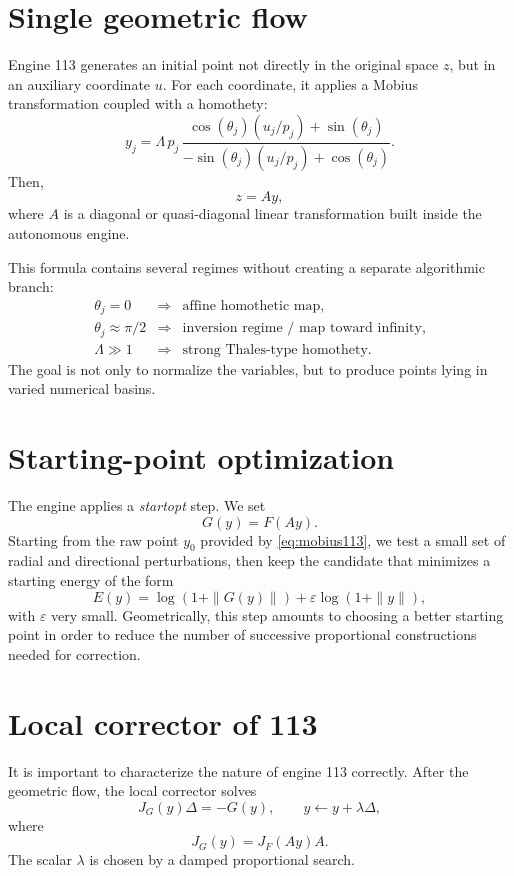 \documentclass[11pt,a4paper]{article}
\begin{document}
\section{Single geometric flow}
Engine 113 generates an initial point not directly in the original space \(z\), but in an auxiliary coordinate \(u\). For each coordinate, it applies a Mobius transformation coupled with a homothety:
\begin{equation}
  y_j
  = \Lambda\, p_j\,
    \frac{\cos(\theta_j)(u_j/p_j)+\sin(\theta_j)}
         {-\sin(\theta_j)(u_j/p_j)+\cos(\theta_j)}.
  \label{eq:mobius113}
\end{equation}
Then,
\begin{equation}
  z = A y,
  \label{eq:linear113}
\end{equation}
where \(A\) is a diagonal or quasi-diagonal linear transformation built inside the autonomous engine.

This formula contains several regimes without creating a separate algorithmic branch:
\[
\begin{array}{lll}
\theta_j=0 & \Rightarrow & \text{affine homothetic map},\\
\theta_j\approx \pi/2 & \Rightarrow & \text{inversion regime / map toward infinity},\\
\Lambda\gg 1 & \Rightarrow & \text{strong Thales-type homothety}.
\end{array}
\]
The goal is not only to normalize the variables, but to produce points lying in varied numerical basins.

\section{Starting-point optimization}
The engine applies a \emph{startopt} step. We set
\[
  G(y)=F(Ay).
\]
Starting from the raw point \(y_0\) provided by \eqref{eq:mobius113}, we test a small set of radial and directional perturbations, then keep the candidate that minimizes a starting energy of the form
\begin{equation}
  E(y)=\log(1+\|G(y)\|)+\varepsilon\log(1+\|y\|),
  \label{eq:startopt113}
\end{equation}
with \(\varepsilon\) very small. Geometrically, this step amounts to choosing a better starting point in order to reduce the number of successive proportional constructions needed for correction.

\section{Local corrector of 113}
It is important to characterize the nature of engine 113 correctly. After the geometric flow, the local corrector solves
\begin{equation}
  J_G(y)\Delta=-G(y),
  \qquad y\leftarrow y+\lambda\Delta,
  \label{eq:newton113}
\end{equation}
where
\begin{equation}
  J_G(y)=J_F(Ay)A.
\end{equation}
The scalar \(\lambda\) is chosen by a damped proportional search.
\end{document}
